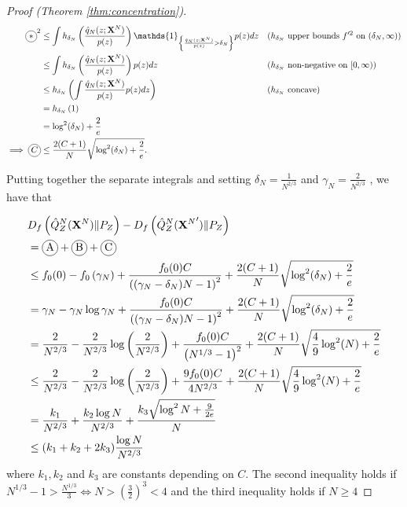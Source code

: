 \begin{proof}[Proof (Theorem \ref{thm:concentration})]
\begin{align*}
    \encircle{$*$}^2
    &\leq \int h_{\delta_N}\left(\frac{\hat{q}_N(z;\XN)}{p(z)} \right) \mathds{1}_{\left\lbrace \frac{\hat{q}_N(z;\XN)}{p(z)} > \delta_N \right\rbrace} p(z) dz
    && \text{($h_{\delta_N}$ upper bounds $f'^2$ on $(\delta_N, \infty)$)}
    \\
    &\leq \int h_{\delta_N}\left(\frac{\hat{q}_N(z;\XN)}{p(z)} \right) p(z) dz
    && \text{($h_{\delta_N}$ non-negative on $[0, \infty)$)}
    \\
    &\leq  h_{\delta_N}\left( \int \frac{\hat{q}_N(z;\XN)}{p(z)} p(z) dz \right) 
    && \text{($h_{\delta_N}$ concave)}
    \\
    &= h_{\delta_N}\left( 1\right) \\
    &= \log^2(\delta_N) + \frac{2}{e}\\
    \implies \encircle{$C$} &\leq \frac{2(C+1)}{N}\sqrt{\log^2(\delta_N) + \frac{2}{e}}.
\end{align*}


Putting together the separate integrals and setting $\delta_N = \frac{1}{N^{2/3}}$ and $\gamma_N = \frac{2}{N^{2/3}}$ , we have that

\begin{align*}
    &D_f\left( \hat{Q}_Z^N(\XN) \| P_Z\right) - D_f\left( \hat{Q}_Z^N({\XN}') \| P_Z\right) \\
    &= \encircle{A} + \encircle{B} + \encircle{C} \\
    &\leq f_0(0) - f_0\left(\gamma_N\right) +  \frac{f_0(0)C}{\left((\gamma_N-\delta_N)N - 1\right)^2} + \frac{2(C+1)}{N} \sqrt{\log^2(\delta_N) + \frac{2}{e} } \\
    &= \gamma_N - \gamma_N \log \gamma_N + \frac{f_0(0)C}{\left((\gamma_N-\delta_N)N - 1\right)^2} + \frac{2(C+1)}{N}  \sqrt{\log^2(\delta_N) + \frac{2}{e}}\\
    &=\frac{2}{N^{2/3}} - \frac{2}{N^{2/3}} \log\left(\frac{2}{N^{2/3}} \right) + \frac{f_0(0)C}{\left(N^{1/3} - 1\right)^2} + \frac{2(C+1)}{N} \sqrt{\frac{4}{9}\log^2(N) + \frac{2}{e}} 
    \\
    &\leq\frac{2}{N^{2/3}} - \frac{2}{N^{2/3}} \log\left(\frac{2}{N^{2/3}} \right) + \frac{9f_0(0)C}{4N^{2/3}} + \frac{2(C+1)}{N} \sqrt{\frac{4}{9}\log^2(N) + \frac{2}{e}} 
    \\
    &= \frac{k_1}{N^{2/3}} + \frac{k_2 \log N}{N^{2/3}} + \frac{k_3 \sqrt{\log^2N + \frac{9}{2e}}}{N}\\
    &\leq (k_1+k_2+2k_3)\frac{\log N}{N^{2/3}}
\end{align*}
where $k_1, k_2$ and $k_3$ are constants depending on $C$.
The second inequality holds if $N^{1/3}-1 > \frac{N^{1/3}}{3} \iff N>\left(\frac{3}{2}\right)^3 < 4$ and the third inequality holds if $N\geq 4$


\end{proof}
